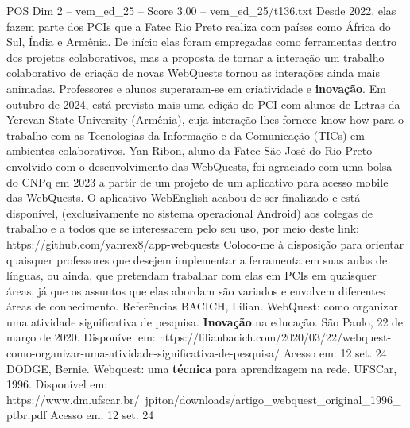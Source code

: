 \begin{textsample}{POS Dim 2 – vem\_ed\_25 – Score 3.00 – vem\_ed\_25/t136.txt}
Desde 2022, elas fazem parte dos PCIs que a Fatec Rio Preto realiza com países como África do Sul, Índia e Armênia.
De início elas foram empregadas como ferramentas dentro dos projetos colaborativos, mas a proposta de tornar a interação um trabalho colaborativo de criação de novas WebQuests tornou as interações ainda mais animadas.
Professores e alunos superaram-se em criatividade e \textbf{inovação}.
Em outubro de 2024, está prevista mais uma edição do PCI com alunos de Letras da Yerevan State University (Armênia), cuja interação lhes fornece know-how para o trabalho com as Tecnologias da Informação e da Comunicação (TICs) em ambientes colaborativos.
Yan Ribon, aluno da Fatec São José do Rio Preto envolvido com o desenvolvimento das WebQuests, foi agraciado com uma bolsa do CNPq em 2023 a partir de um projeto de um aplicativo para acesso mobile das WebQuests.
O aplicativo WebEnglish acabou de ser finalizado e está disponível, (exclusivamente no sistema operacional Android) aos colegas de trabalho e a todos que se interessarem pelo seu uso, por meio deste link: https://github.com/yanrex8/app-webquests Coloco-me à disposição para orientar quaisquer professores que desejem implementar a ferramenta em suas aulas de línguas, ou ainda, que pretendam trabalhar com elas em PCIs em quaisquer áreas, já que os assuntos que elas abordam são variados e envolvem diferentes áreas de conhecimento.
Referências BACICH, Lilian.
WebQuest: como organizar uma atividade significativa de pesquisa. \textbf{Inovação} na educação.
São Paulo, 22 de março de 2020.
Disponível em: https://lilianbacich.com/2020/03/22/webquest-como-organizar-uma-atividade-significativa-de-pesquisa/ Acesso em: 12 set. 24 DODGE, Bernie.
Webquest: uma \textbf{técnica} para aprendizagem na rede.
UFSCar, 1996.
Disponível em: https://www.dm.ufscar.br/~jpiton/downloads/artigo\_webquest\_original\_1996\_ptbr.pdf Acesso em: 12 set. 24

\end{textsample}
